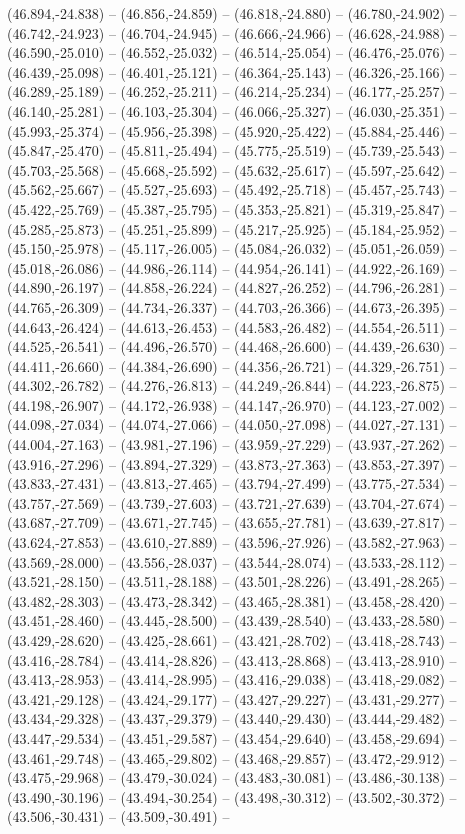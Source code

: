 (46.894,-24.838) -- (46.856,-24.859) -- (46.818,-24.880) -- (46.780,-24.902) -- (46.742,-24.923) -- (46.704,-24.945) -- (46.666,-24.966) -- (46.628,-24.988) -- (46.590,-25.010) -- (46.552,-25.032) -- (46.514,-25.054) -- (46.476,-25.076) -- (46.439,-25.098) -- (46.401,-25.121) -- (46.364,-25.143) -- (46.326,-25.166) -- (46.289,-25.189) -- (46.252,-25.211) -- (46.214,-25.234) -- (46.177,-25.257) -- (46.140,-25.281) -- (46.103,-25.304) -- (46.066,-25.327) -- (46.030,-25.351) -- (45.993,-25.374) -- (45.956,-25.398) -- (45.920,-25.422) -- (45.884,-25.446) -- (45.847,-25.470) -- (45.811,-25.494) -- (45.775,-25.519) -- (45.739,-25.543) -- (45.703,-25.568) -- (45.668,-25.592) -- (45.632,-25.617) -- (45.597,-25.642) -- (45.562,-25.667) -- (45.527,-25.693) -- (45.492,-25.718) -- (45.457,-25.743) -- (45.422,-25.769) -- (45.387,-25.795) -- (45.353,-25.821) -- (45.319,-25.847) -- (45.285,-25.873) -- (45.251,-25.899) -- (45.217,-25.925) -- (45.184,-25.952) -- (45.150,-25.978) -- (45.117,-26.005) -- (45.084,-26.032) -- (45.051,-26.059) -- (45.018,-26.086) -- (44.986,-26.114) -- (44.954,-26.141) -- (44.922,-26.169) -- (44.890,-26.197) -- (44.858,-26.224) -- (44.827,-26.252) -- (44.796,-26.281) -- (44.765,-26.309) -- (44.734,-26.337) -- (44.703,-26.366) -- (44.673,-26.395) -- (44.643,-26.424) -- (44.613,-26.453) -- (44.583,-26.482) -- (44.554,-26.511) -- (44.525,-26.541) -- (44.496,-26.570) -- (44.468,-26.600) -- (44.439,-26.630) -- (44.411,-26.660) -- (44.384,-26.690) -- (44.356,-26.721) -- (44.329,-26.751) -- (44.302,-26.782) -- (44.276,-26.813) -- (44.249,-26.844) -- (44.223,-26.875) -- (44.198,-26.907) -- (44.172,-26.938) -- (44.147,-26.970) -- (44.123,-27.002) -- (44.098,-27.034) -- (44.074,-27.066) -- (44.050,-27.098) -- (44.027,-27.131) -- (44.004,-27.163) -- (43.981,-27.196) -- (43.959,-27.229) -- (43.937,-27.262) -- (43.916,-27.296) -- (43.894,-27.329) -- (43.873,-27.363) -- (43.853,-27.397) -- (43.833,-27.431) -- (43.813,-27.465) -- (43.794,-27.499) -- (43.775,-27.534) -- (43.757,-27.569) -- (43.739,-27.603) -- (43.721,-27.639) -- (43.704,-27.674) -- (43.687,-27.709) -- (43.671,-27.745) -- (43.655,-27.781) -- (43.639,-27.817) -- (43.624,-27.853) -- (43.610,-27.889) -- (43.596,-27.926) -- (43.582,-27.963) -- (43.569,-28.000) -- (43.556,-28.037) -- (43.544,-28.074) -- (43.533,-28.112) -- (43.521,-28.150) -- (43.511,-28.188) -- (43.501,-28.226) -- (43.491,-28.265) -- (43.482,-28.303) -- (43.473,-28.342) -- (43.465,-28.381) -- (43.458,-28.420) -- (43.451,-28.460) -- (43.445,-28.500) -- (43.439,-28.540) -- (43.433,-28.580) -- (43.429,-28.620) -- (43.425,-28.661) -- (43.421,-28.702) -- (43.418,-28.743) -- (43.416,-28.784) -- (43.414,-28.826) -- (43.413,-28.868) -- (43.413,-28.910) -- (43.413,-28.953) -- (43.414,-28.995) -- (43.416,-29.038) -- (43.418,-29.082) -- (43.421,-29.128) -- (43.424,-29.177) -- (43.427,-29.227) -- (43.431,-29.277) -- (43.434,-29.328) -- (43.437,-29.379) -- (43.440,-29.430) -- (43.444,-29.482) -- (43.447,-29.534) -- (43.451,-29.587) -- (43.454,-29.640) -- (43.458,-29.694) -- (43.461,-29.748) -- (43.465,-29.802) -- (43.468,-29.857) -- (43.472,-29.912) -- (43.475,-29.968) -- (43.479,-30.024) -- (43.483,-30.081) -- (43.486,-30.138) -- (43.490,-30.196) -- (43.494,-30.254) -- (43.498,-30.312) -- (43.502,-30.372) -- (43.506,-30.431) -- (43.509,-30.491) -- 